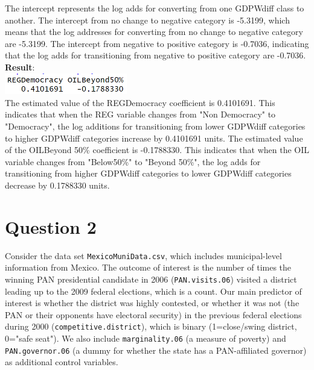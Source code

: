 \documentclass[12pt,letterpaper]{article}
\begin{document}
\begin{enumerate}
	The intercept represents the log adds for converting from one GDPWdiff class to another. The intercept from no change to negative category is -5.3199, which means that the log addresses for converting from no change to negative category are -5.3199. The intercept from negative to positive category is -0.7036, indicating that the log adds for transitioning from negative to positive category are -0.7036.
	\\
	 
	\textbf{Result}:\\
	\includegraphics[width=0.4\textwidth]{Q1_5.png}\\
	The estimated value of the REGDemocracy coefficient is 0.4101691. This indicates that when the REG variable changes from "Non Democracy" to "Democracy", the log additions for transitioning from lower GDPWdiff categories to higher GDPWdiff categories increase by 0.4101691 units.
	The estimated value of the OILBeyond 50\% coefficient is -0.1788330. This indicates that when the OIL variable changes from "Below50\%" to "Beyond 50\%", the log adds for transitioning from higher GDPWdiff categories to lower GDPWdiff categories decrease by 0.1788330 units.
	\\
	
	
\end{enumerate}

\section*{Question 2} 
\vspace{.25cm}

\noindent Consider the data set \texttt{MexicoMuniData.csv}, which includes municipal-level information from Mexico. The outcome of interest is the number of times the winning PAN presidential candidate in 2006 (\texttt{PAN.visits.06}) visited a district leading up to the 2009 federal elections, which is a count. Our main predictor of interest is whether the district was highly contested, or whether it was not (the PAN or their opponents have electoral security) in the previous federal elections during 2000 (\texttt{competitive.district}), which is binary (1=close/swing district, 0="safe seat"). We also include \texttt{marginality.06} (a measure of poverty) and \texttt{PAN.governor.06} (a dummy for whether the state has a PAN-affiliated governor) as additional control variables. 
\end{document}
